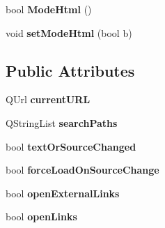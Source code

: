 \begin{DoxyCompactItemize}
\item 
\hypertarget{classraEdit_a67ba2869e64b8e3322354599b4a8cc0d}{
bool {\bfseries ModeHtml} ()}
\label{classraEdit_a67ba2869e64b8e3322354599b4a8cc0d}

\item 
\hypertarget{classraEdit_ad4ba648986bbc4846a6d6be095f3c8b6}{
void {\bfseries setModeHtml} (bool b)}
\label{classraEdit_ad4ba648986bbc4846a6d6be095f3c8b6}

\end{DoxyCompactItemize}
\subsection*{Public Attributes}
\begin{DoxyCompactItemize}
\item 
\hypertarget{classraEdit_a210d3a47ab3fddf885284e3723537501}{
QUrl {\bfseries currentURL}}
\label{classraEdit_a210d3a47ab3fddf885284e3723537501}

\item 
\hypertarget{classraEdit_ad8de8a6739aa2b8d37e5eaa885eef5d9}{
QStringList {\bfseries searchPaths}}
\label{classraEdit_ad8de8a6739aa2b8d37e5eaa885eef5d9}

\item 
\hypertarget{classraEdit_aa2d846ccedea8fec0a55afafd47bae08}{
bool {\bfseries textOrSourceChanged}}
\label{classraEdit_aa2d846ccedea8fec0a55afafd47bae08}

\item 
\hypertarget{classraEdit_a26258974664a4d2569e3529d3bbab615}{
bool {\bfseries forceLoadOnSourceChange}}
\label{classraEdit_a26258974664a4d2569e3529d3bbab615}

\item 
\hypertarget{classraEdit_a4c576c4d9bae5471ba3f47ce68cff0c2}{
bool {\bfseries openExternalLinks}}
\label{classraEdit_a4c576c4d9bae5471ba3f47ce68cff0c2}

\item 
\hypertarget{classraEdit_a7148458a070db8a86e53637caacca1c9}{
bool {\bfseries openLinks}}
\label{classraEdit_a7148458a070db8a86e53637caacca1c9}

\end{DoxyCompactItemize}
